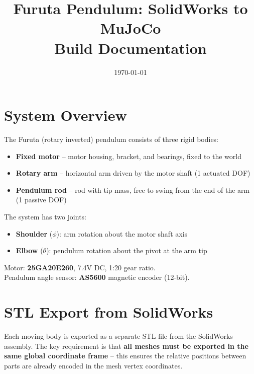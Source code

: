 \documentclass[12pt,a4paper]{article}
\title{\textbf{Furuta Pendulum: SolidWorks to MuJoCo}\\
\large Build Documentation}
\author{}
\date{\today}
\begin{document}
\maketitle
\tableofcontents
\newpage

\section{System Overview}

The Furuta (rotary inverted) pendulum consists of three rigid bodies:

\begin{itemize}
    \item \textbf{Fixed motor} -- motor housing, bracket, and bearings, fixed to the world
    \item \textbf{Rotary arm} -- horizontal arm driven by the motor shaft (1 actuated DOF)
    \item \textbf{Pendulum rod} -- rod with tip mass, free to swing from the end of the arm (1 passive DOF)
\end{itemize}

\noindent The system has two joints:
\begin{itemize}
    \item \textbf{Shoulder} ($\phi$): arm rotation about the motor shaft axis
    \item \textbf{Elbow} ($\theta$): pendulum rotation about the pivot at the arm tip
\end{itemize}

\noindent Motor: \textbf{25GA20E260}, 7.4V DC, 1:20 gear ratio.\\
Pendulum angle sensor: \textbf{AS5600} magnetic encoder (12-bit).

\section{STL Export from SolidWorks}

Each moving body is exported as a separate STL file from the SolidWorks assembly.
The key requirement is that \textbf{all meshes must be exported in the same global coordinate frame} -- this ensures the relative positions between parts are already encoded in the mesh vertex coordinates.
\end{document}
